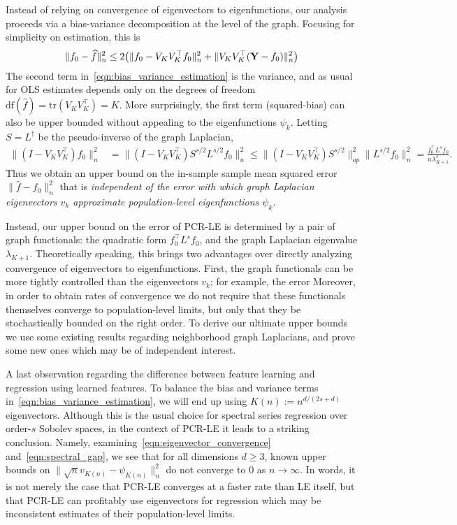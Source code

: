 \documentclass{article}
\theoremstyle{definition}
\newcommand{\wh}[1]{\widehat{#1}}
\newcommand{\1}{\mathbf{1}}
\begin{document}
	Instead of relying on convergence of eigenvectors to eigenfunctions, our analysis proceeds via a bias-variance decomposition at the level of the graph. Focusing for simplicity on estimation, this is 
	\begin{equation}
	\label{eqn:bias_variance_estimation}
	\|f_0 - \wh{f}\|_n^2 \leq 2\bigl(\|f_0 - V_KV_K^{\top}f_0\|_n^2 + \|V_KV_K^{\top}({\bf Y} - f_0)\|_n^2\bigr) 
	\end{equation}
	The second term in~\eqref{eqn:bias_variance_estimation} is the variance, and as usual for OLS estimates depends only on the degrees of freedom $\mathrm{df}(\wh{f}) = \mathrm{tr}(V_KV_K^{\top}) = K$. More surprisingly, the first term (squared-bias) can also be upper bounded without appealing to the eigenfunctions $\psi_k$. Letting $S = L^{\dagger}$ be the pseudo-inverse of the graph Laplacian,
	\begin{equation}
	\begin{aligned}
	\|(I - V_KV_K^{\top})f_0\|_n^2 & = \|(I - V_KV_K^{\top})S^{s/2}L^{s/2}f_0\|_n^2 \leq \|(I - V_KV_K^{\top})S^{s/2}\|_{op}^2 \|L^{s/2}f_0\|_n^2 = \frac{f_0^{\top} L^s f_0}{n \lambda_{K + 1}^{s}}.
	\end{aligned}
	\end{equation}
	Thus we obtain an upper bound on the in-sample sample mean squared error $\|\wh{f} - f_0\|_n^2$ that is \emph{independent of the error with which graph Laplacian eigenvectors $v_k$ approximate population-level eigenfunctions $\psi_k$}. 
	
	Instead, our upper bound on the error of PCR-LE is determined by a pair of graph functionals: the quadratic form $f_0^{\top}L^s f_0$, and the graph Laplacian eigenvalue $\lambda_{K + 1}$. Theoretically speaking, this brings two advantages over directly analyzing convergence of eigenvectors to eigenfunctions. First, the graph functionals can be more tightly controlled than the eigenvectors $v_k$; for example, the error  Moreover, in order to obtain rates of convergence we do not require that these functionals themselves converge to population-level limits, but only that they be stochastically bounded on the right order. To derive our ultimate upper bounds we use some existing results regarding neighborhood graph Laplacians, and prove some new ones which may be of independent interest. 
		
	A last observation regarding the difference between feature learning and regression using learned features. To balance the bias and variance terms in~\eqref{eqn:bias_variance_estimation}, we will end up using $K(n) := n^{d/(2s + d)}$ eigenvectors. Although this is the usual choice for spectral series regression over order-$s$ Sobolev spaces, in the context of PCR-LE it leads to a striking conclusion. Namely, examining~\eqref{eqn:eigenvector_convergence} and~\eqref{eqn:spectral_gap}, we see that for all dimensions $d \geq 3$, known upper bounds on $\|\sqrt{n} v_{K(n)} - \psi_{K(n)}\|_n^2$ do not converge to $0$ as $n \to \infty$. In words, it is not merely the case that PCR-LE converges at a faster rate than LE itself, but that PCR-LE can profitably use eigenvectors for regression which may be inconsistent estimates of their population-level limits. 
	
\end{document}
